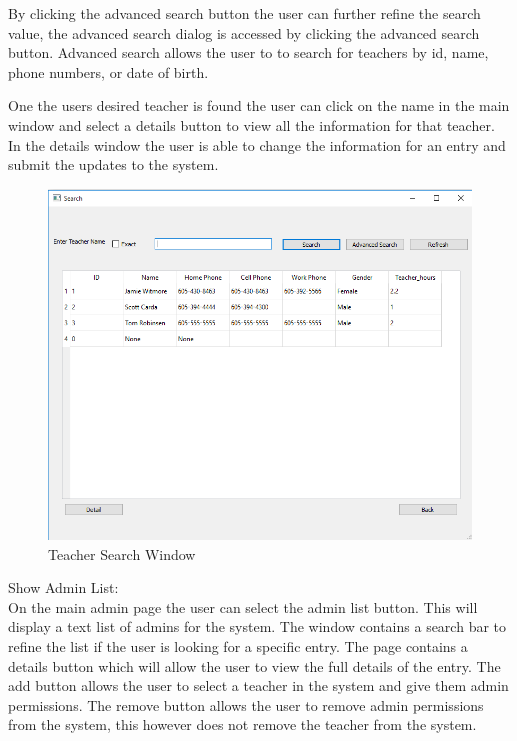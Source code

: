 By clicking the advanced search button the user can further refine the search value, the advanced search dialog is accessed by clicking the advanced search button. Advanced search allows the user to to search for teachers by id, name, phone numbers, or date of birth.

One the users desired teacher is found the user can click on the name in the main window and select a details button to view all the information for that teacher.  In the details window the user is able to change the information for an entry and submit the updates to the system.\\

\begin{figure}
  \includegraphics[width=\linewidth]{pics/userGuide/teacherSearch.png}
  \caption{Teacher Search Window}
  \label{fig:User doc: Teacher Search}
\end{figure}

Show Admin List:\\
On the main admin page the user can select the admin list button. This will display a text list of admins for the system. The window contains a search bar to refine the list if the user is looking for a specific entry. The page contains a details button which will allow the user to view the full details of the entry. The add button allows the user to select a teacher in the system and give them admin permissions.  The remove button allows the user to remove admin permissions from the system, this however does not remove the teacher from the system.\\


